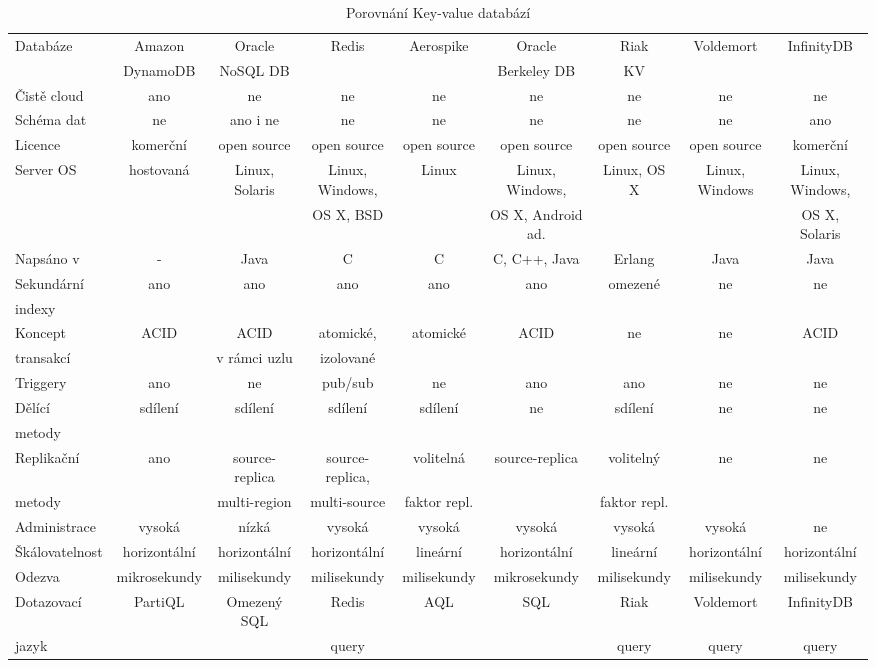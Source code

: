 \documentclass[czech,master,dept460,male,csharp,cpdeclaration]{diploma}
\begin{document}
	\begin{table}
		\centering
		\caption{Porovnání Key-value databází\label{tab_kvdb_compare}}
		\scalebox{0.8}
		{
			\begin{tabular}{ l|c c c c c c c c } 
				\toprule
				Databáze & Amazon & Oracle & Redis & Aerospike & Oracle & Riak & Voldemort & InfinityDB \\
				& DynamoDB & NoSQL DB & & & Berkeley DB & KV & & \\
				\midrule
				Čistě cloud & ano & ne & ne & ne & ne & ne & ne & ne \\
				Schéma dat & ne & ano i ne & ne & ne & ne & ne & ne & ano \\
				Licence & komerční & open source & open source & open source & open source & open source & open source & komerční \\
				Server OS & hostovaná & Linux, Solaris & Linux, Windows, & Linux & Linux, Windows, & Linux, OS X & Linux, Windows &  Linux, Windows, \\
				& & & OS X, BSD & & OS X, Android ad. & & & OS X, Solaris\\
				Napsáno v & - & Java & C & C & C, C++, Java & Erlang & Java & Java\\
				Sekundární & ano & ano & ano & ano & ano & omezené & ne & ne \\
				indexy & & & & & & & & \\
				Koncept & ACID & ACID & atomické, & atomické & ACID & ne & ne & ACID \\
				transakcí & & v rámci uzlu & izolované & & & & & \\
				Triggery & ano & ne & pub/sub & ne & ano & ano & ne & ne \\
				Dělící & sdílení & sdílení & sdílení & sdílení & ne & sdílení & ne & ne \\ 
				metody \\
				Replikační & ano & source-replica & source-replica, & volitelná & source-replica & volitelný & ne & ne \\
				metody & & multi-region & multi-source & faktor repl. & & faktor repl. \\
				Administrace & vysoká & nízká & vysoká & vysoká & vysoká & vysoká & vysoká & ne\\
				Škálovatelnost & horizontální & horizontální & horizontální & lineární & horizontální & lineární & horizontální & horizontální\\
				Odezva & mikrosekundy & milisekundy & milisekundy & milisekundy & mikrosekundy & milisekundy & milisekundy & milisekundy \\
				Dotazovací & PartiQL & Omezený SQL & Redis & AQL & SQL & Riak & Voldemort & InfinityDB \\
				jazyk & & & query & & & query & query & query \\
				\bottomrule
			\end{tabular}
		}
	\end{table}
	
\end{document}

